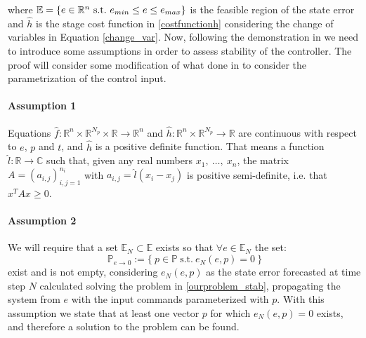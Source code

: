 where $\mathbb{E} = \lbrace {e}\in \mathbb{R}^n\ \textnormal{s.t.}\ {e}_{min}\leq e\leq e_{max} \rbrace$ is the feasible region of the state error and $\hat{h}$ is the stage cost function in \ref{costfunctionh} considering the change of variables in Equation \ref{change_var}. Now, following the demonstration in \cite{alamir2018stability} we need to introduce some assumptions in order to assess stability of the controller. The proof will consider some modification of what done in \cite{alamir2018stability} to consider the parametrization of the control input. 

\paragraph{Assumption 1} Equations $\hat{f}: \mathbb{R}^n\times\mathbb{R}^{N_p}\times\mathbb{R}\rightarrow\mathbb{R}^n$ and $\hat{h}: \mathbb{R}^n\times\mathbb{R}^{N_p}\rightarrow\mathbb{R}$ are continuous with respect to $e$, $p$ and $t$, and $\hat{h}$ is a positive definite function. That means a function $\hat{l}:\mathbb{R} \to \mathbb{C}$ such that, given any real numbers $x_1,\ \dots,\ x_n$, the matrix $A={(a_{i,j})}_{i,j=1}^{n_i}$ with $a_{i,j}=\hat{l}(x_i-x_j)$ is positive semi-definite, i.e. that $x^TAx \ge 0$. 

\paragraph{Assumption 2} We will require that a set $\mathbb{E}_N\subset\mathbb{E}$ exists so that $\forall e \in \mathbb{E}_N $ the set:
\begin{equation*}
	\mathbb{P}_{e \to 0}:=\lbrace \ p \in \mathbb{P}\ \text{s.t.}\ e_{N}(e,p)=0\ \rbrace
\end{equation*} exist and is not empty, considering $e_{N}(e,p)$ as the state error forecasted at time step $N$ calculated solving the problem in \ref{ourproblem_stab}, propagating the system from $e$ with the input commands parameterized with $p$. With this assumption we state that at least one vector $p$ for which $e_{N}(e,p)=0$ exists, and therefore a solution to the problem can be found.


